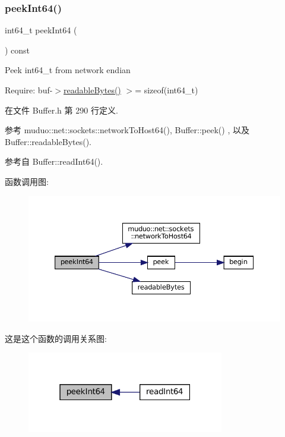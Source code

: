 \subsubsection{\texorpdfstring{peek\+Int64()}{peekInt64()}}
{\footnotesize\ttfamily int64\+\_\+t peek\+Int64 (\begin{DoxyParamCaption}{ }\end{DoxyParamCaption}) const\hspace{0.3cm}{\ttfamily [inline]}}

Peek int64\+\_\+t from network endian

Require\+: buf-\/$>$\hyperlink{classmuduo_1_1net_1_1Buffer_afba1d23196411daa43950fdbbff6d724}{readable\+Bytes()} $>$= sizeof(int64\+\_\+t) 

在文件 Buffer.\+h 第 290 行定义.



参考 muduo\+::net\+::sockets\+::network\+To\+Host64(), Buffer\+::peek() , 以及 Buffer\+::readable\+Bytes().



参考自 Buffer\+::read\+Int64().

函数调用图\+:
\nopagebreak
\begin{figure}[H]
\begin{center}
\leavevmode
\includegraphics[width=350pt]{classmuduo_1_1net_1_1Buffer_a78f18c2f695bc9fb75781596a16d9416_cgraph}
\end{center}
\end{figure}
这是这个函数的调用关系图\+:
\nopagebreak
\begin{figure}[H]
\begin{center}
\leavevmode
\includegraphics[width=244pt]{classmuduo_1_1net_1_1Buffer_a78f18c2f695bc9fb75781596a16d9416_icgraph}
\end{center}
\end{figure}
\mbox{\label{classmuduo_1_1net_1_1Buffer_a28a767d788ebbb53bef6c939cfa8b5fb}} 
